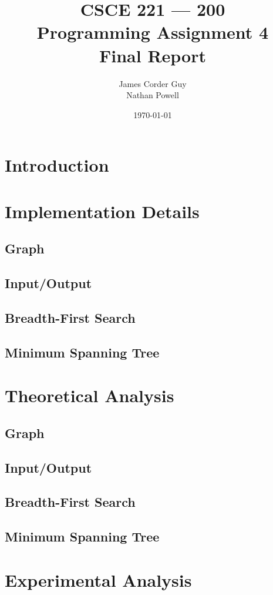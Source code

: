 \documentclass[titlepage]{article}
\title{
	\textbf{
		CSCE 221 --- 200 \\
		Programming Assignment 4 \\
		Final Report
	}
}
\author{
	James Corder Guy \\
	Nathan Powell
}
\date{
	\today
}
\begin{document}
	
	\maketitle
	\begin{multicols}{2}
		\section{Introduction}
		\section{Implementation Details}
			\subsection{Graph}
			\subsection{Input/Output}
			\subsection{Breadth-First Search}
			\subsection{Minimum Spanning Tree}

		\section{Theoretical Analysis}
			\subsection{Graph}
			\subsection{Input/Output}
			\subsection{Breadth-First Search}
			\subsection{Minimum Spanning Tree}

		\section{Experimental Analysis}

\end{multicols}
\end{document}
